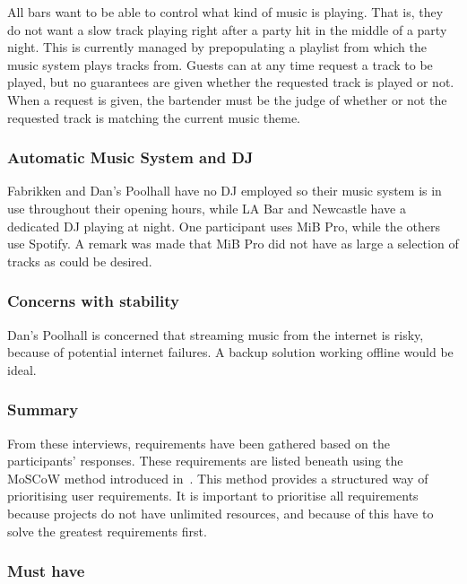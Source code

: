 All bars want to be able to control what kind of music is playing. That is, they do not want a slow track playing right after a party hit in the middle of a party night. This is currently managed by prepopulating a playlist from which the music system plays tracks from. Guests can at any time request a track to be played, but no guarantees are given whether the requested track is played or not. When a request is given, the bartender must be the judge of whether or not the requested track is matching the current music theme.

\subsubsection{Automatic Music System and DJ}
\label{sub:differences}
Fabrikken and Dan's Poolhall have no DJ employed so their music system is in use throughout their opening hours, while LA Bar and Newcastle have a dedicated DJ playing at night. One participant uses MiB Pro, while the others use Spotify. A remark was made that MiB Pro did not have as large a selection of tracks as could be desired.

\subsubsection{Concerns with stability}
\label{sub:specific_remarks}

Dan's Poolhall is concerned that streaming music from the internet is risky, because of potential internet failures. A backup solution working offline would be ideal.

\subsubsection{Summary}
\label{sub:summary}

From these interviews, requirements have been gathered based on the participants' responses. These requirements are listed beneath using the MoSCoW method introduced in~\cite{benyon2013designing}. This method provides a structured way of prioritising user requirements. It is important to prioritise all requirements because projects do not have unlimited resources, and because of this have to solve the greatest requirements first.

\subsubsection{Must have}

